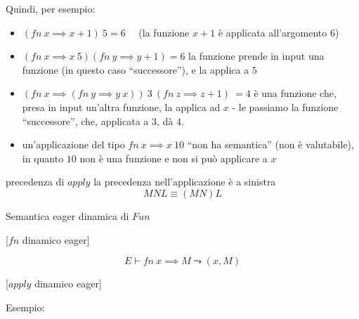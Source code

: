 \documentclass[a4paper,11pt]{report}
\begin{document}
Quindi, per esempio:
\begin{itemize}
    \item \( (fn \ x \implies x+1) \ 5 = 6\) \ \ (la funzione \( x+1 \) è applicata all'argomento \( 6 \))
    \item \( (fn \ x \implies x \ 5)(fn \ y \implies y + 1) = 6 \)
        \subitem la funzione prende in input una funzione (in questo caso ``successore''), e la applica a \( 5 \)
    \item \( (fn \ x \implies (fn \ y \implies y \ x)) \ 3 \ (fn \ z \implies z+1) \ = 4\)
        \subitem è una funzione che, presa in input un'altra funzione, la applica ad \( x \) - le passiamo la funzione ``successore'', che, applicata a \( 3 \), dà \( 4 \).
    \item un'applicazione del tipo \( fn \ x \implies x \ 10 \) ``non ha semantica'' (non è valutabile), in quanto \( 10 \) non è una funzione e non si può applicare a \( x \)
\end{itemize}

\begin{gbox}{precedenza di \( apply \)}
    la precedenza nell'applicazione è a sinistra
    \[ MNL \equiv (MN)L \]
\end{gbox}

\begin{defbox}[colback=DeepGreenLight, colframe=DeepGreen, colbacktitle=DeepGreen]{Semantica eager dinamica di \( Fun \)}{}
    
\begin{center}
    [\( fn \) dinamico eager]
\end{center}
\vspace{-1em}
    \[  E \vdash fn \ x \implies M \leadsto (x, M) \]

\begin{center}
    [\( apply \) dinamico eager]
\end{center}
\vspace{-2.3em}
\begin{prooftree}
\end{prooftree}
    
\end{defbox}

Esempio:
\end{document}
